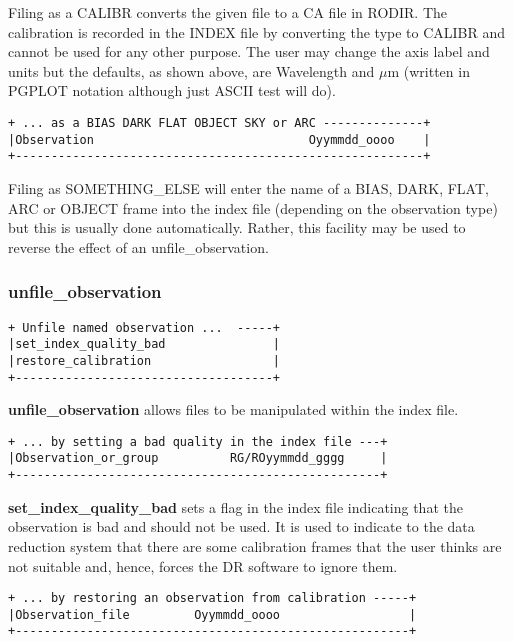 {Filing as a {\sf CALIBR} converts the given file to a CA file in RODIR.
The calibration is recorded in the INDEX file by converting the type to 
{\sf CALIBR} and cannot be used for any other purpose. The user may change 
the axis label and units but the defaults, as shown above, are 
{\sf Wavelength} and {\sf $\mu$m} (written in PGPLOT notation although 
just ASCII test will do). 

\begin{verbatim}
+ ... as a BIAS DARK FLAT OBJECT SKY or ARC --------------+
|Observation                              Oyymmdd_oooo    |
+---------------------------------------------------------+
\end{verbatim}

Filing as {\sf SOMETHING\_ELSE} will enter the name of a {\sf BIAS}, 
{\sf DARK}, {\sf FLAT}, {\sf ARC} or {\sf OBJECT} frame into the index 
file (depending on the observation type) but this is usually done 
automatically. Rather, this facility may be used to reverse the effect of 
an {\sf unfile\_observation}.

\subsubsection{unfile\_observation}
\label{unfile_observation}
\begin{verbatim}
+ Unfile named observation ...  -----+
|set_index_quality_bad               |
|restore_calibration                 |
+------------------------------------+
\end{verbatim}

{\bf unfile\_observation} allows files to be manipulated within the index file.

\begin{verbatim}
+ ... by setting a bad quality in the index file ---+
|Observation_or_group          RG/ROyymmdd_gggg     |
+---------------------------------------------------+
\end{verbatim}

{\bf set\_index\_quality\_bad} sets a flag in the index file indicating that 
the observation is {\sf bad} and should not be used. It is used to indicate to
the data reduction system that there are some calibration frames that the
user thinks are not suitable and, hence, forces the DR software to ignore them.

\begin{verbatim}
+ ... by restoring an observation from calibration -----+
|Observation_file         Oyymmdd_oooo                  |
+-------------------------------------------------------+
\end{verbatim}

}
